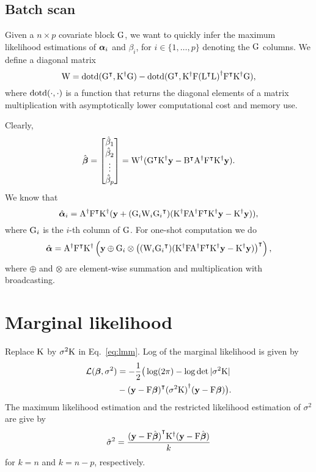 \documentclass[twocolumn,draft]{article}
\begin{document}
\subsection{Batch scan}

Given a $n\times p$ covariate block $\mathrm{G}$, we want to quickly infer the
maximum likelihood estimations of $\boldsymbol{\alpha}_i$ and $\beta_i$, for
$i \in \{1, \dots, p\}$ denoting the $\mathrm{G}$ columns.
We define a diagonal matrix
\begin{equation*}
	\mathrm{W} = \mathrm{dotd} ({\mathrm{G}}^\intercal, {\mathrm{K}}^{\dagger}\mathrm{G}) -
	       \mathrm{dotd} ({\mathrm{G}}^\intercal, {\mathrm{K}}^{\dagger}\mathrm{F}
				 {({\mathrm{L}}^\intercal\mathrm{L})}^{\dagger}{\mathrm{F}}^\intercal{\mathrm{K}}^{\dagger}\mathrm{G}),
\end{equation*}
where $\mathrm{dotd} (\cdot, \cdot)$ is a function that returns the diagonal elements
of a matrix multiplication with asymptotically lower computational cost and
memory use.

Clearly,
\begin{equation*}
	\hat{\boldsymbol{\beta}} =
	\begin{bmatrix}
		\hat\beta_1 \\
		\hat\beta_2 \\
		\vdots \\
		\hat\beta_p
	\end{bmatrix}
	= {\mathrm{W}}^{\dagger}({\mathrm{G}}^\intercal{\mathrm{K}}^{\dagger}\mathbf{y}
	-{\mathrm{B}}^\intercal{\mathrm{A}}^{\dagger}{\mathrm{F}}^\intercal{\mathrm{K}}^{\dagger}\mathbf{y}).
\end{equation*}
We know that
\begin{equation*}
	\hat{\boldsymbol{\alpha}}_i = {\mathrm{A}}^{\dagger}{\mathrm{F}}^\intercal{\mathrm{K}}^{\dagger}
	(\mathbf{y} + (\mathrm{G}_i \mathrm{W}_i {\mathrm{G}_i}^\intercal)
	({\mathrm{K}}^{\dagger}\mathrm{F}{\mathrm{A}}^{\dagger}{\mathrm{F}}^\intercal{\mathrm{K}}^{\dagger}\mathbf{y} - {\mathrm{K}}^{\dagger}\mathbf{y})),
\end{equation*}
where $\mathrm{G}_i$ is the $i$-th column of $\mathrm{G}$.
For one-shot computation we do
\begin{equation*}
	\hat{\boldsymbol{\alpha}} = {\mathrm{A}}^{\dagger}{\mathrm{F}}^\intercal{\mathrm{K}}^{\dagger}
	\left(\mathbf{y} \oplus \mathrm{G}_i \otimes
	{\left((\mathrm{W}_i {\mathrm{G}_i}^\intercal)
	  ({\mathrm{K}}^{\dagger}\mathrm{F}{\mathrm{A}}^{\dagger}{\mathrm{F}}^\intercal{\mathrm{K}}^{\dagger}\mathbf{y}- {\mathrm{K}}^{\dagger}\mathbf{y})\right)}^\intercal\right),
\end{equation*}
where $\oplus$ and $\otimes$ are element-wise summation and multiplication
with broadcasting.

\section{Marginal likelihood}

Replace $\mathrm{K}$ by $\sigma^2\mathrm{K}$ in Eq.~\eqref{eq:lmm}.
Log of the marginal likelihood is given by
\begin{align*}
  \mathcal{L}(\boldsymbol{\beta}, \sigma^2) &=
	-\frac{1}{2}\big(\log(2\pi) - \log\det|\sigma^2\mathrm{K}| \\
	&- {(\mathbf{y} - \mathrm{F}\boldsymbol{\beta})}^\intercal {(\sigma^2\mathrm{K})}^{\dagger} (\mathbf{y} - \mathrm{F}\boldsymbol{\beta})
	\big).
\end{align*}
The maximum likelihood estimation and the restricted likelihood estimation of
$\sigma^2$ are give by
\begin{equation*}
	\hat\sigma^2 = \frac{
		{(\mathbf{y} - \mathrm{F}\hat{\boldsymbol{\beta}})}^\intercal
			{\mathrm{K}}^{\dagger}
		(\mathbf{y} - \mathrm{F}\hat{\boldsymbol{\beta}})
	}{k}
\end{equation*}
for $k = n$ and $k = n - p$, respectively.
\end{document}
